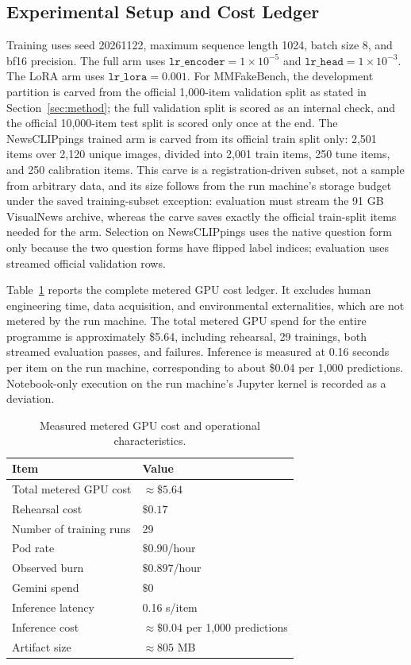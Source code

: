 \documentclass{article} %
\begin{document}
\subsection{Experimental Setup and Cost Ledger}
Training uses seed 20261122, maximum sequence length 1024, batch size 8, and bf16 precision. The full arm uses \( \texttt{lr\_encoder}=1\times10^{-5} \) and \( \texttt{lr\_head}=1\times10^{-3} \). The LoRA arm uses \( \texttt{lr\_lora}=0.001 \). For MMFakeBench, the development partition is carved from the official 1,000-item validation split as stated in Section~\ref{sec:method}; the full validation split is scored as an internal check, and the official 10,000-item test split is scored only once at the end. The NewsCLIPpings trained arm is carved from its official train split only: 2,501 items over 2,120 unique images, divided into 2,001 train items, 250 tune items, and 250 calibration items. This carve is a registration-driven subset, not a sample from arbitrary data, and its size follows from the run machine's storage budget under the saved training-subset exception: evaluation must stream the 91 GB VisualNews archive, whereas the carve saves exactly the official train-split items needed for the arm. Selection on NewsCLIPpings uses the native question form only because the two question forms have flipped label indices; evaluation uses streamed official validation rows.

Table~\ref{tab:cost} reports the complete metered GPU cost ledger. It excludes human engineering time, data acquisition, and environmental externalities, which are not metered by the run machine. The total metered GPU spend for the entire programme is approximately \$5.64, including rehearsal, 29 trainings, both streamed evaluation passes, and failures. Inference is measured at 0.16 seconds per item on the run machine, corresponding to about \$0.04 per 1,000 predictions. Notebook-only execution on the run machine's Jupyter kernel is recorded as a deviation.

\begin{table}[t]
\centering
\small
\caption{Measured metered GPU cost and operational characteristics.}
\label{tab:cost}
\begin{tabular}{ll}
\toprule
Item & Value \\
\midrule
Total metered GPU cost & \(\approx \$5.64\) \\
Rehearsal cost & \(\$0.17\) \\
Number of training runs & 29 \\
Pod rate & \(\$0.90\)/hour \\
Observed burn & \(\$0.897\)/hour \\
Gemini spend & \(\$0\) \\
Inference latency & 0.16 s/item \\
Inference cost & \(\approx \$0.04\) per 1,000 predictions \\
Artifact size & \(\approx 805\) MB \\
\bottomrule
\end{tabular}
\end{table}
\end{document}
